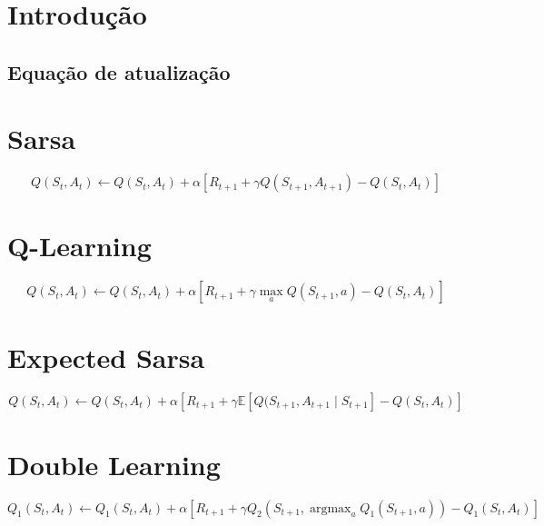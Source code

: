 \documentclass{article}
\title{Aprendizado por Reforço \vskip .5em Notas de aula}
\author{Paulo Bruno de Sousa Serafim}
\date{2019}
\DeclareMathOperator*{\argmax}{argmax} %
\begin{document}
\maketitle

\section{Introdução}

    \subsection{Equação de atualização}
    
\section{Sarsa}

    \begin{equation}
        Q(S_t, A_t) \leftarrow Q(S_t, A_t) + \alpha \left[ R_{t+1} + \gamma Q(S_{t+1}, A_{t+1}) - Q(S_t, A_t) \right]
    \end{equation}
    
\section{Q-Learning}

    \begin{equation}
        Q(S_t, A_t) \leftarrow Q(S_t, A_t) + \alpha \left[ R_{t+1} + \gamma \max_{a} Q(S_{t+1}, a) - Q(S_t, A_t) \right]
    \end{equation}

\section{Expected Sarsa}

    \begin{equation}
        Q(S_t, A_t) \leftarrow Q(S_t, A_t) + \alpha \left[ R_{t+1} + \gamma \mathbb{E}[Q(S_{t+1}, A_{t+1} \mid S_{t+1}] - Q(S_t, A_t) \right]
    \end{equation}
    
\section{Double Learning}

    \begin{equation}
        Q_{1}(S_t, A_t) \leftarrow Q_{1}(S_t, A_t) + \alpha \left[ R_{t+1} + \gamma Q_{2}(S_{t+1}, \argmax_a Q_{1}(S_{t+1}, a)) - Q_{1}(S_t, A_t) \right]
    \end{equation}
    
\end{document}
